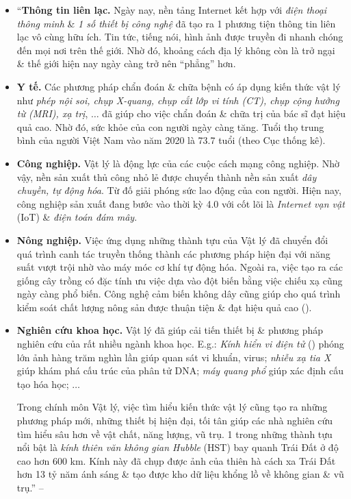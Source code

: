 \documentclass[oneside]{book}
\numberwithin{equation}{section}
\begin{document}
\begin{itemize}
	\item ``\textbf{Thông tin liên lạc.} Ngày nay, nền tảng Internet kết hợp với \textit{điện thoại thông minh} \& \textit{1 số thiết bị công nghệ} đã tạo ra 1 phương tiện thông tin liên lạc vô cùng hữu ích. Tin tức, tiếng nói, hình ảnh được truyền đi nhanh chóng đến mọi nơi trên thế giới. Nhờ đó, khoảng cách địa lý không còn là trở ngại \& thế giới hiện nay ngày càng trở nên ``phẳng'' hơn.
	\item \textbf{Y tế.} Các phương pháp chẩn đoán \& chữa bệnh có áp dụng kiến thức vật lý như \textit{phép nội soi, chụp X-quang, chụp cắt lớp vi tính (CT), chụp cộng hưởng từ (MRI), xạ trị}, $\ldots$ đã giúp cho việc chẩn đoán \& chữa trị của bác sĩ đạt hiệu quả cao. Nhờ đó, sức khỏe của con người ngày càng tăng. Tuổi thọ trung bình của người Việt Nam vào năm 2020 là 73.7 tuổi (theo Cục thống kê).
	\item \textbf{Công nghiệp.} Vật lý là động lực của các cuộc cách mạng công nghiệp. Nhờ vậy, nền sản xuất thủ công nhỏ lẻ được chuyển thành nền sản xuất \textit{dây chuyền, tự động hóa}. Từ đố giải phóng sức lao động của con người. Hiện nay, công nghiệp sản xuất đang bước vào thời kỳ 4.0 với cốt lõi là \textit{Internet vạn vật} (IoT) \& \textit{điện toán đám mây}.
	\item \textbf{Nông nghiệp.} Việc ứng dụng những thành tựu của Vật lý đã chuyển đổi quá trình canh tác truyền thống thành các phương pháp hiện đại với năng suất vượt trội nhờ vào máy móc cơ khí tự động hóa. Ngoài ra, việc tạo ra các giống cây trồng có đặc tính ưu việc dựa vào đột biến bằng việc chiếu xạ cũng ngày càng phổ biến. Công nghệ cảm biến không dây cũng giúp cho quá trình kiểm soát chất lượng nông sản được thuận tiện \& đạt hiệu quả cao (\cite[Hình 1.6: \textsf{Công nghệ cảm biến trong việc kiểm soát chất lượng nông sản.}, p. 10]{SGK_Vat_Ly_10_Chan_Troi_Sang_Tao}).
	\item \textbf{Nghiên cứu khoa học.} Vật lý đã giúp cải tiến thiết bị \& phương pháp nghiên cứu của rất nhiều ngành khoa học. E.g.: \textit{Kính hiển vi điện tử} (\cite[Hình 1.7: \textsf{Kính hiển vi điện tử}, p. 10]{SGK_Vat_Ly_10_Chan_Troi_Sang_Tao}) phóng lớn ảnh hàng trăm nghìn lần giúp quan sát vi khuẩn, virus; \textit{nhiễu xạ tia X} giúp khám phá cấu trúc của phân tử DNA; \textit{máy quang phổ} giúp xác định cấu tạo hóa học; $\ldots$
	
	Trong chính môn Vật lý, việc tìm hiểu kiến thức vật lý cũng tạo ra những phương pháp mới, những thiết bị hiện đại, tối tân giúp các nhà nghiên cứu tìm hiểu sâu hơn về vật chất, năng lượng, vũ trụ. 1 trong những thành tựu nổi bật là \textit{kính thiên văn không gian Hubble} (HST) bay quanh Trái Đất ở độ cao hơn 600 km. Kính này đã chụp được ảnh của thiên hà cách xa Trái Đất hơn 13 tỷ năm ánh sáng \& tạo được kho dữ liệu khổng lồ về không gian \& vũ trụ.'' -- \cite[p. 10]{SGK_Vat_Ly_10_Chan_Troi_Sang_Tao}
\end{itemize}
\end{document}
